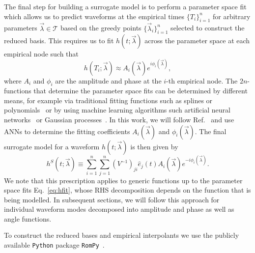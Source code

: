 \documentclass[prd,amssymb,amsmath,amsfonts,superscriptaddress,nofootinbib,reprint,showpacs, longbibliography]{revtex4-1}
\begin{document}
The final step for building a surrogate model is to perform a parameter space fit which allows us to predict waveforms at the empirical times $\{T_i\}_{i=1}^n$ for arbitrary parameters $\vec{\lambda} \in \mathcal{T}$ based on the greedy points $\{\vec{\lambda}_i\}_{i=1}^n$ selected to construct the reduced basis. This requires us to fit $h(t;\vec{\lambda})$ across the parameter space at each empirical node such that
\begin{equation}
\label{eq:hfit}
    h(T_i; \vec{\lambda}) \approx A_i (\vec{\lambda}) e^{i \phi_i(\vec{\lambda})},
\end{equation}
where $A_i$ and $\phi_i$ are the amplitude and phase at the $i$-th empirical node. 
The $2n$-functions that determine the parameter space fits can be determined by different means, for example via traditional fitting functions such as splines or polynomials~\cite{Field:2011mf, Blackman:2015pia, Varma:2019csw} or by using machine learning algorithms such artificial neural networks~\cite{Khan:2020fso, Fragkouli:2022lpt} or Gaussian processes~\cite{Varma:2018mmi,Williams:2019vub, Islam:2021mha, Yoo:2022erv}. In this work, we will follow Ref.~\cite{Khan:2020fso} and use ANNs to determine the fitting coefficients $A_i(\vec{\lambda})$ and $\phi_i(\vec{\lambda})$.
The final surrogate model for a waveform $h(t; \vec{\lambda})$ is then given by 
\begin{equation}
    h^S(t; \vec{\lambda}) \equiv \sum_{i=1}^n \sum_{j=1}^n (V^{-1})_{ji} \hat{e}_j(t) A_i(\vec{\lambda})e^{-i\phi_i(\vec{\lambda})}.
    \label{eq:sur}
\end{equation}
We note that this prescription applies to generic functions up to the parameter space fits Eq.~\eqref{eq:hfit}, whose RHS decomposition depends on the function that is being modelled. In subsequent sections, we will follow this approach for individual waveform modes decomposed into amplitude and phase as well as angle functions.

To construct the reduced bases and empirical interpolants we use the publicly available \texttt{Python} package \texttt{RomPy}~\cite{Field:2013cfa, rompy}.


\end{document}
